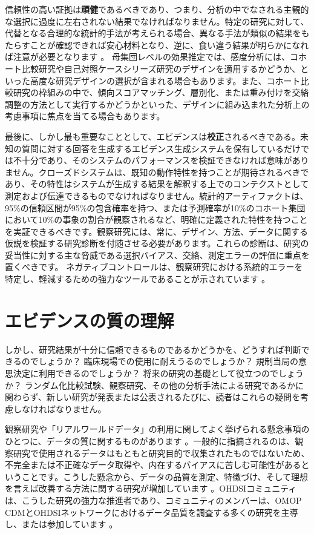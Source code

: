 \documentclass[
  11pt]{book}
\theoremstyle{definition}
\theoremstyle{definition}
\theoremstyle{definition}
\theoremstyle{definition}
\theoremstyle{remark}
\begin{document}
信頼性の高い証拠は\textbf{頑健}であるべきであり、つまり、分析の中でなされる主観的な選択に過度に左右されない結果でなければなりません。特定の研究に対して、代替となる合理的な統計的手法が考えられる場合、異なる手法が類似の結果をもたらすことが確認できれば安心材料となり、逆に、食い違う結果が明らかになれば注意が必要となります \citep{madigan2013design} 。 母集団レベルの効果推定では、感度分析には、コホート比較研究や自己対照ケースシリーズ研究のデザインを適用するかどうか、といった高度な研究デザインの選択が含まれる場合もあります。また、コホート比較研究の枠組みの中で、傾向スコアマッチング、層別化、または重み付けを交絡調整の方法として実行するかどうかといった、デザインに組み込まれた分析上の考慮事項に焦点を当てる場合もあります。

最後に、しかし最も重要なこととして、エビデンスは\textbf{校正}されるべきである。未知の質問に対する回答を生成するエビデンス生成システムを保有しているだけでは不十分であり、そのシステムのパフォーマンスを検証できなければ意味がありません。クローズドシステムは、既知の動作特性を持つことが期待されるべきであり、その特性はシステムが生成する結果を解釈する上でのコンテクストとして測定および伝達できるものでなければなりません。統計的アーティファクトは、95\%の信頼区間が95\%の包含確率を持つ、または予測確率が10\%のコホート集団において10\%の事象の割合が観察されるなど、明確に定義された特性を持つことを実証できるべきです。観察研究には、常に、デザイン、方法、データに関する仮説を検証する研究診断を付随させる必要があります。これらの診断は、研究の妥当性に対する主な脅威である選択バイアス、交絡、測定エラーの評価に重点を置くべきです。 ネガティブコントロールは、観察研究における系統的エラーを特定し、軽減するための強力なツールであることが示されています \citep{schuemie_2016, schuemie_2018, schuemie_2018b} 。

\section{エビデンスの質の理解}\label{ux30a8ux30d3ux30c7ux30f3ux30b9ux306eux8ceaux306eux7406ux89e3}

しかし、研究結果が十分に信頼できるものであるかどうかを、どうすれば判断できるのでしょうか？ 臨床現場での使用に耐えうるのでしょうか？ 規制当局の意思決定に利用できるのでしょうか？ 将来の研究の基礎として役立つのでしょうか？ ランダム化比較試験、観察研究、その他の分析手法による研究であるかに関わらず、新しい研究が発表または公表されるたびに、読者はこれらの疑問を考慮しなければなりません。

観察研究や「リアルワールドデータ」の利用に関してよく挙げられる懸念事項のひとつに、データの質に関するものがあります \citep{botsis2010secondary, hersh2013caveats, sherman2016real} 。一般的に指摘されるのは、観察研究で使用されるデータはもともと研究目的で収集されたものではないため、不完全または不正確なデータ取得や、内在するバイアスに苦しむ可能性があるということです。こうした懸念から、データの品質を測定、特徴づけ、そして理想を言えば改善する方法に関する研究が増加しています \citep{kahn2012pragmatic, liaw2013towards, weiskopf_2013} 。OHDSIコミュニティは、こうした研究の強力な推進者であり、コミュニティのメンバーは、OMOP CDMとOHDSIネットワークにおけるデータ品質を調査する多くの研究を主導し、または参加しています \citep{huser_multisite_2016, kahn_transparent_2015, callahan2017comparison, yoon_2016} 。
\end{document}
